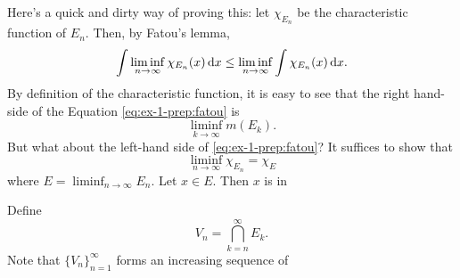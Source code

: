 \begin{solution}
  Here's a quick and dirty way of proving this: let $\chi_{E_n}$ be the
  characteristic function of $E_n$. Then, by Fatou's lemma,
  \begin{equation}
    \label{eq:ex-1-prep:fatou}
    \int\liminf_{n\to\infty}\chi_{E_n}(x)\mathop{}\!\mathrm{d} x
    \leq\liminf_{n\to\infty}\int\chi_{E_n}(x)\mathop{}\!\mathrm{d} x.
  \end{equation}
  By definition of the characteristic function, it is easy to see that the
  right hand-side of the Equation \eqref{eq:ex-1-prep:fatou} is
  \[
    \liminf_{k\to\infty}m(E_k).
  \]
  But what about the left-hand side of \eqref{eq:ex-1-prep:fatou}? It
  suffices to show that
  \[
    \liminf_{n\to\infty}\chi_{E_n}=\chi_{E}
  \]
  where $E=\liminf_{n\to\infty} E_n$. Let $x\in E$. Then $x$ is in

  Define
  \[
    V_n=\bigcap_{k=n}^\infty E_k.
  \]
  Note that ${\{V_n\}}_{n=1}^\infty$ forms an increasing sequence of
\end{solution}


